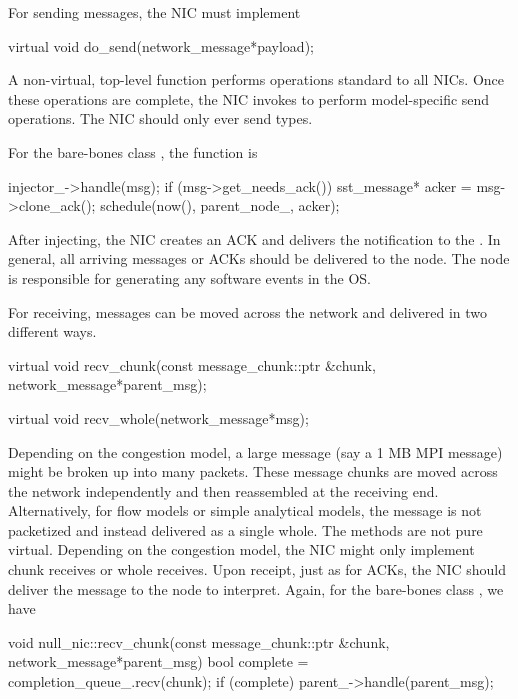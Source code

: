 For sending messages, the NIC must implement

\begin{CppCode}
  virtual void
  do_send(network_message*payload);
\end{CppCode}
A non-virtual, top-level  function performs operations standard to all NICs.
Once these operations are complete, the NIC invokes  to perform model-specific send operations.
The NIC should only ever send  types.

For the bare-bones class , the function is

\begin{CppCode}
  injector_->handle(msg);
  if (msg->get_needs_ack()) {
    sst_message* acker = msg->clone_ack();
    schedule(now(), parent_node_, acker);
  }
\end{CppCode}
After injecting, the NIC creates an ACK and delivers the notification to the \nodecls.
In general, all arriving messages or ACKs should be delivered to the node.
The node is responsible for generating any software events in the OS.

For receiving, messages can be moved across the network and delivered in two different ways.

\begin{CppCode}
  virtual void
  recv_chunk(const message_chunk::ptr &chunk,
             network_message*parent_msg);

  virtual void
  recv_whole(network_message*msg);
\end{CppCode}

Depending on the congestion model, a large message (say a 1 MB MPI message) might be broken up into many packets.
These message chunks are moved across the network independently and then reassembled at the receiving end.
Alternatively, for flow models or simple analytical models, the message is not packetized and instead delivered as a single whole.
The methods are not pure virtual.  Depending on the congestion model,  the NIC might only implement chunk receives or whole receives.
Upon receipt, just as for ACKs, the NIC should deliver the message to the node to interpret.
Again, for the bare-bones class , we have

\begin{CppCode}
void
null_nic::recv_chunk(const message_chunk::ptr &chunk,
                     network_message*parent_msg)
{
  bool complete = completion_queue_.recv(chunk);
  if (complete){
    parent_->handle(parent_msg);
  }
}
\end{CppCode}

